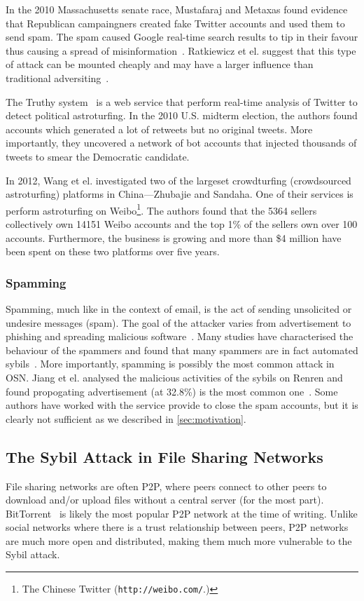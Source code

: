 In the 2010 Massachusetts senate race, Mustafaraj and Metaxas found evidence
that Republican campaingners created fake Twitter accounts and used them to send
spam. The spam caused Google real-time search results to tip in their favour
thus causing a spread of misinformation~\cite{mustafaraj2010obscurity}.
Ratkiewicz et el. suggest that this type of attack can be mounted cheaply and
may have a larger influence than traditional
adversiting~\cite{ratkiewicz2011truthy}.

The Truthy system~\cite{ratkiewicz2011truthy} is a web service that perform
real-time analysis of Twitter to detect political astroturfing. In the 2010
U.S. midterm election, the authors found accounts which generated a lot of
retweets but no original tweets. More importantly, they uncovered a network of
bot accounts that injected thousands of tweets to smear the Democratic candidate.

In 2012, Wang et el. investigated two of the largeset crowdturfing (crowdsourced
astroturfing) platforms in China---Zhubajie and Sandaha. One of their services
is perform astroturfing on Weibo\footnote{The Chinese Twitter
  (\texttt{http://weibo.com/}.)}. The authors found that the 5364 sellers
collectively own 14151 Weibo accounts and the top 1\% of the sellers own over
100 accounts. Furthermore, the business is growing and more than \$4 million
have been spent on these two platforms over five years\cite{wang2012serf}.

\subsubsection{Spamming}
Spamming, much like in the context of email, is the act of sending unsolicited
or undesire messages (spam). The goal of the attacker varies from advertisement
to phishing and spreading malicious software~\cite{twittermalware1,
  twittermalware2}. Many studies have characterised the behaviour of the
spammers and found that many spammers are in fact automated
sybils~\cite{stringhini2010detecting, yang2012analyzing, grier2010spam,
  jiang2015understanding}. More importantly, spamming is possibly the most
common attack in OSN. Jiang et el. analysed the malicious activities of the
sybils on Renren and found propogating advertisement (at 32.8\%) is the most
common one~\cite{jiang2015understanding}. Some authors have worked with the
service provide to close the spam accounts, but it is clearly not sufficient as
we described in \autoref{sec:motivation}.


\subsection{The Sybil Attack in File Sharing Networks}
File sharing networks are often P2P, where peers connect to other peers to
download and/or upload files without a central server (for the most part).
BitTorrent~\cite{bep3} is likely the most popular P2P network at the time of
writing. Unlike social networks where there is a trust relationship between
peers, P2P networks are much more open and distributed, making them much more
vulnerable to the Sybil attack.

